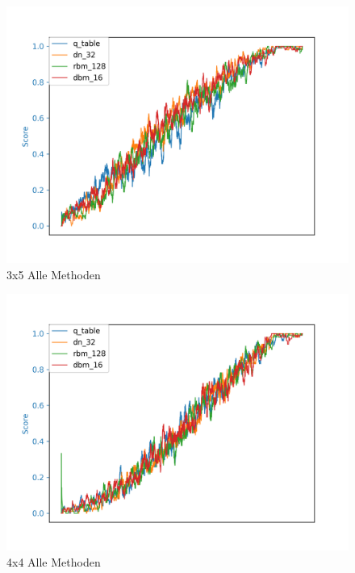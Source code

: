 \begin{figure}[H]
\centering
\includegraphics[width=\textwidth]{Figures/all_3x5_q_table_dn_32_rbm_128_dbm_16.png}
\caption{3x5 Alle Methoden}
\label{all_3}
\end{figure}

\begin{figure}[H]
\centering
\includegraphics[width=\textwidth]{Figures/all_4x4_q_table_dn_32_rbm_128_dbm_16.png}
\caption{4x4 Alle Methoden}
\label{all_4}
\end{figure}


